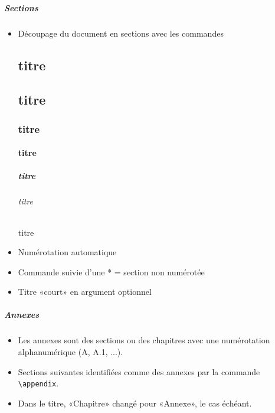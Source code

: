 \begin{frame}[fragile]

	\frametitle{Sections}
	
	\begin{itemize}
		\item Découpage du document en sections avec les commandes
		
		\begin{codesource}
	\part{titre}
	\chapter{titre}
	\section{titre}
	\subsection{titre}
		\end{codesource}
	
		\begin{codesource}
	\subsubsection{titre}		%
		\end{codesource}
	
		\begin{codesource}
	\paragraph{titre}				%
	\subparagraph{titre}		%
		\end{codesource}
	
		\item Numérotation automatique
		\item Commande suivie d’une * = section non numérotée
		\item Titre «court» en argument optionnel
	\end{itemize}
\end{frame}


\begin{frame}[c,fragile]
	
	\frametitle{Annexes}
	
	\begin{itemize}
		\item Les annexes sont des sections ou des chapitres avec une numérotation alphanumérique (A, A.1, ...).
		\item Sections suivantes identifiées comme des annexes par la
		commande \lstinline|\appendix|.
		\item Dans le titre, «Chapitre» changé pour «Annexe», le cas échéant.
	\end{itemize}
\end{frame}

